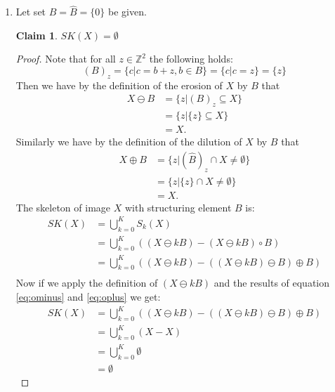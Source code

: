 \documentclass[a4paper]{article}
\newtheorem*{claim}{Claim}
\begin{document}
\begin{enumerate}
\item
Let set $B = \hat{B} = \{0\}$ be given. \\
\begin{claim}
    $SK(X) = \emptyset$
\end{claim}
\begin{proof}
Note that for all $z \in \mathbb{Z}^{2}$ the following holds:
\[
    (B)_{z} = \{c|c = b + z, b \in B\} = \{c|c = z\} = \{z\}
\]
Then we have by the definition of the erosion of $X$ by $B$ that
\begin{align} \label{eq:ominus}
    X \ominus B &= \{z | (B)_{z} \subseteq X\} \nonumber\\
                &= \{z | \{z\} \subseteq X\} \\
                &= X. \nonumber
\end{align}
Similarly we have by the definition of the dilution of $X$ by $B$ that
\begin{align} \label{eq:oplus}
    X \oplus B &= \{z | (\hat{B})_{z} \cap X \neq \emptyset\} \nonumber\\
               &= \{z | \{z\} \cap X \neq \emptyset\} \\
               &= X. \nonumber
\end{align}
The skeleton of image $X$ with structuring element $B$ is:
\begin{align*}
    SK(X) &= \bigcup_{k = 0}^K S_{k}(X) \\
          &= \bigcup_{k = 0}^K \left((X\ominus kB) - (X \ominus kB) \circ B\right) \\
          &= \bigcup_{k = 0}^K \left((X \ominus kB) - ((X \ominus kB) \ominus B) \oplus B\right) \\
\end{align*}
Now if we apply the definition of $(X \ominus kB)$ and the results of equation \ref{eq:ominus} and \ref{eq:oplus} we get:
\begin{align*}
    SK(X) &= \bigcup_{k = 0}^K \left((X \ominus kB) - ((X \ominus kB) \ominus B) \oplus B\right) \\
          &= \bigcup_{k = 0}^K \left(X - X\right) \\
          &= \bigcup_{k = 0}^K \emptyset \\
          &= \emptyset
\end{align*}
\end{proof}


\end{enumerate}
\end{document}
